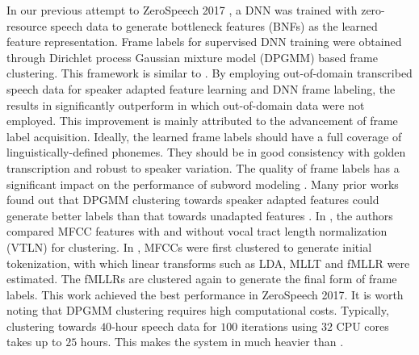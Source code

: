 \documentclass[a4paper]{article}
\begin{document}
In our previous attempt to ZeroSpeech 2017  \cite{Feng2018exploiting}, a  DNN was trained with   zero-resource speech data to generate bottleneck features (BNFs) as the learned feature representation. Frame labels for supervised DNN training were obtained through Dirichlet process Gaussian mixture model (DPGMM) based frame clustering. This framework is similar to \cite{chen2017multilingual}.
By employing  out-of-domain transcribed speech data for speaker adapted feature learning and DNN frame labeling, the results in \cite{Feng2018exploiting} significantly outperform  \cite{chen2017multilingual} in which out-of-domain data were not employed. 
This improvement is mainly attributed to the advancement of frame label acquisition.   
Ideally, the learned  frame labels should have a full coverage of linguistically-defined phonemes. They should be  in good consistency with golden transcription and  robust to speaker variation. The quality of frame labels has a significant impact on the performance of subword modeling \cite{heck2017feature}.
Many prior works found out that DPGMM clustering towards speaker adapted features could generate better labels than that towards unadapted features \cite{HeckSN16,heck2017feature,chen2017multilingual}. In \cite{chen2017multilingual}, the authors compared MFCC features with and without vocal tract length normalization (VTLN) for clustering. 
In \cite{heck2017feature}, MFCCs were first clustered to generate initial tokenization, with which  linear transforms such as LDA, MLLT and fMLLR  were estimated. The fMLLRs are clustered again to generate the final form of frame labels. This work achieved the best performance in ZeroSpeech 2017. 
It is worth noting that DPGMM clustering requires  high computational costs. 
Typically, clustering towards $40$-hour speech data for $100$ iterations using $32$ CPU cores takes up to $25$ hours. This makes the system in \cite{heck2017feature} much heavier than  \cite{chen2017multilingual,Feng2018exploiting}.
\end{document}
